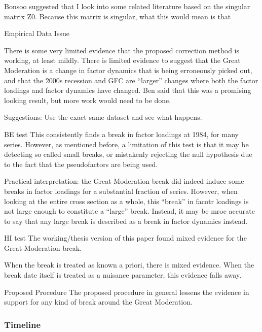 \documentclass[
]{article}
\begin{document}
Bonsoo suggested that I look into some related literature based on the
singular matrix Z0. Because this matrix is singular, what this would
mean is that

Empirical Data Issue

There is some very limited evidence that the proposed correction method
is working, at least mildly. There is limited evidence to suggest that
the Great Moderation is a change in factor dynamics that is being
erroneously picked out, and that the 2000s recession and GFC are
``larger'' changes where both the factor loadings and factor dynamics
have changed. Ben said that this was a promising looking result, but
more work would need to be done.

Suggestions: Use the exact same dataset and see what happens.

BE test This consistently finds a break in factor loadings at 1984, for
many series. However, as mentioned before, a limitation of this test is
that it may be detecting so called small breaks, or mistakenly rejecting
the null hypothesis due to the fact that the pseudofactors are being
used.

Practical interpretation: the Great Moderation break did indeed induce
some breaks in factor loadings for a substantial fraction of series.
However, when looking at the entire cross section as a whole, this
``break'' in facotr loadings is not large enough to constitute a
``large'' break. Instead, it may be mroe accurate to say that any large
break is described as a break in factor dynamics instead.

HI test The working/thesis version of this paper found mixed evidence
for the Great Moderation break.

When the break is treated as known a priori, there is mixed evidence.
When the break date itself is treated as a nuisance parameter, this
evidence falls away.

Proposed Procedure The proposed procedure in general lessens the
evidence in support for any kind of break around the Great Moderation.

\hypertarget{timeline}{%
\subsubsection{Timeline}\label{timeline}}

\printbibliography 
\end{document}
